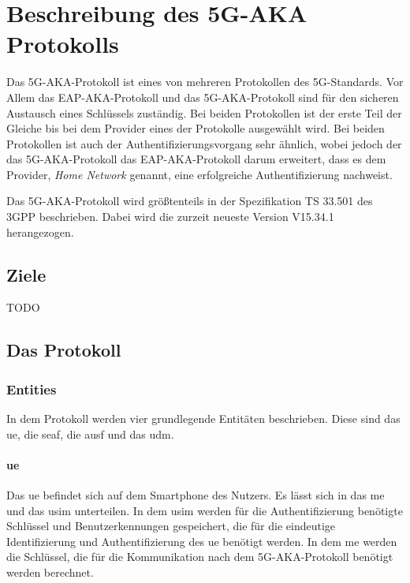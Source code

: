 \chapter{Beschreibung des 5G-AKA Protokolls}
\label{chap:2}

Das 5G-AKA-Protokoll ist eines von mehreren Protokollen des 5G-Standards.
Vor Allem das EAP-AKA-Protokoll und das 5G-AKA-Protokoll sind f\"ur den sicheren Austausch eines Schl\"ussels zust\"andig. 
Bei beiden Protokollen ist der erste Teil der Gleiche bis bei dem Provider eines der Protokolle ausgew\"ahlt wird. %
Bei beiden Protokollen ist auch der Authentifizierungsvorgang sehr \"ahnlich, wobei jedoch der das 5G-AKA-Protokoll das EAP-AKA-Protokoll darum erweitert, dass es dem Provider, \textit{Home Network} genannt, eine erfolgreiche Authentifizierung nachweist. %

Das 5G-AKA-Protokoll wird gr\"o{\ss}tenteils in der Spezifikation TS 33.501 des 3GPP beschrieben. %
Dabei wird die zurzeit neueste Version V15.34.1 herangezogen.

\section{Ziele}

TODO

\section{Das Protokoll}

\subsection{Entities}

In dem Protokoll werden vier grundlegende Entit\"aten beschrieben.
Diese sind das \gls{ue}, die \gls{seaf}, die \gls{ausf} und das \gls{udm}.

\subsubsection{\gls{ue}}

Das \gls{ue} befindet sich auf dem Smartphone des Nutzers.
Es l\"asst sich in das \gls{me} und das \gls{usim} unterteilen.
In dem \gls{usim} werden f\"ur die Authentifizierung ben\"otigte Schl\"ussel und Benutzerkennungen gespeichert, die f\"ur die eindeutige Identifizierung und Authentifizierung des \gls{ue} ben\"otigt werden. %
In dem \gls{me} werden die Schl\"ussel, die f\"ur die Kommunikation nach dem 5G-AKA-Protokoll ben\"otigt werden berechnet.

